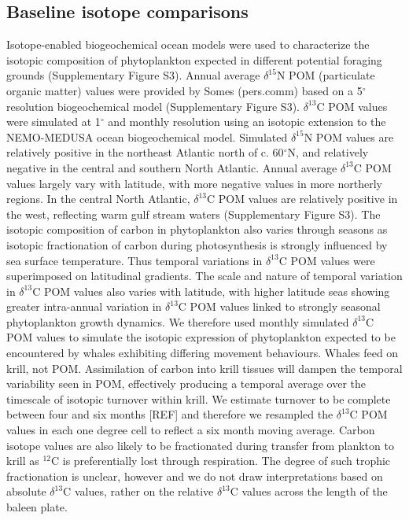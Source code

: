 \documentclass[a4paper,12pt]{article}
\begin{document}
\subsection{Baseline isotope comparisons}
Isotope-enabled biogeochemical ocean models\cite{magozzi2017using,schmittner2016complementary} were used to characterize the isotopic composition of phytoplankton expected in different potential foraging grounds (Supplementary Figure S3). 
Annual average $\delta^{15}$N POM (particulate organic matter) values were provided by Somes (pers.comm) based on a 5$^{\circ}$ resolution biogeochemical model (Supplementary Figure S3). 
$\delta^{13}$C POM values were simulated at 1$^{\circ}$ and monthly resolution using an isotopic extension to the NEMO-MEDUSA ocean biogeochemical model\cite{magozzi2017using,yool2013medusa}. 
Simulated  $\delta^{15}$N POM values are relatively positive in the northeast Atlantic north of c. 60$^{\circ}$N, and relatively negative in the central and southern North Atlantic. 
Annual average $\delta^{13}$C POM values largely vary with latitude, with more negative values in more northerly regions. 
In the central North Atlantic, $\delta^{13}$C POM values are relatively positive in the west, reflecting warm gulf stream waters (Supplementary Figure S3). 
The isotopic composition of carbon in phytoplankton also varies through seasons as isotopic fractionation of carbon during photosynthesis is strongly influenced by sea surface temperature\cite{magozzi2017using,laws1995dependence}.
Thus temporal variations in $\delta^{13}$C POM values were superimposed on latitudinal gradients. 
The scale and nature of temporal variation in $\delta^{13}$C POM values also varies with latitude, with higher latitude seas showing greater intra-annual variation in $\delta^{13}$C POM values linked to strongly seasonal phytoplankton growth dynamics. 
We therefore used monthly simulated $\delta^{13}$C POM values to simulate the isotopic expression of phytoplankton expected to be encountered by whales exhibiting differing movement behaviours.
Whales feed on krill, not POM. 
Assimilation of carbon into krill tissues will dampen the temporal variability seen in POM, effectively producing a temporal average over the timescale of isotopic turnover within krill. 
We estimate turnover to be complete between four and six months [REF] and therefore we resampled the $\delta^{13}$C POM values in each one degree cell to reflect a six month moving average. 
Carbon isotope values are also likely to be fractionated during transfer from plankton to krill as $^{12}$C  is preferentially lost through respiration. 
The degree of such trophic fractionation is unclear, however and we do not draw interpretations based on absolute $\delta^{13}$C values, rather on the relative $\delta^{13}$C  values across the length of the baleen plate.
 
\end{document}
